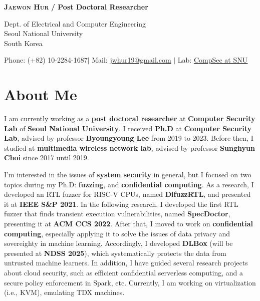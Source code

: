 \documentclass[letterpaper,11pt]{article}
\begin{document}


\begin{center}
    \textbf{\Huge \scshape Jaewon Hur} \textbf{ /  Post Doctoral Researcher} \\ \vspace{10pt}
    
    Dept. of Electrical and Computer Engineering \\
    Seoul National University \\
    South Korea \\ \vspace{10pt}
    
    \small Phone: (+82) 10-2284-1687$|$ Mail: \href{mailto:jwhur19@gmail.com}{\underline{jwhur19@gmail.com}} $|$ 
    Lab: \href{https://compsec.snu.ac.kr}{\underline{CompSec at SNU}}
\end{center}

\vspace{15pt}
\section{About Me}

I am currently working as a \textbf{post doctoral researcher} at \textbf{Computer Security Lab} of \textbf{Seoul National University}. I received \textbf{Ph.D} at \textbf{Computer Security Lab}, advised by professor \textbf{Byoungyoung Lee} from 2019 to 2023. Before then, I studied at \textbf{multimedia wireless network lab}, advised by professor \textbf{Sunghyun Choi} since 2017 until 2019.

I'm interested in the issues of \textbf{system security} in general, but I focused on two topics during my Ph.D: \textbf{fuzzing}, and \textbf{confidential computing}. As a research, I developed an RTL fuzzer for RISC-V CPUs, named \textbf{DifuzzRTL}, and presented it at \textbf{IEEE S\&P 2021}. In the following research, I developed the first RTL fuzzer that finds transient execution vulnerabilities, named \textbf{SpecDoctor}, presenting it at \textbf{ACM CCS 2022}. After that, I moved to work on \textbf{confidential computing}, especially applying it to solve the issues of data privacy and sovereighty in machine learning. Accordingly, I developed \textbf{DLBox} (will be presented at \textbf{NDSS 2025}), which systematically protects the data from untrusted machine learners. In addition, I have guided several research projects about cloud security, such as efficient confidential serverless computing, and a secure policy enforcement in Spark, etc. Currently, I am working on virtualization (i.e., KVM), emulating TDX machines.
\end{document}
